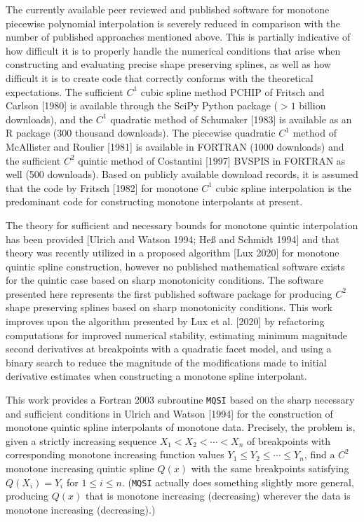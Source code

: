 The currently available peer reviewed and published software for
monotone piecewise polynomial interpolation is severely reduced in
comparison with the number of published approaches mentioned
above. This is partially indicative of how difficult it is to properly
handle the numerical conditions that arise when constructing and
evaluating precise shape preserving splines, as well as how difficult
it is to create code that correctly conforms with the theoretical
expectations. The sufficient $C^1$ cubic spline method PCHIP of
Fritsch and Carlson [1980] is available through the SciPy Python
package ($>1$ billion downloads), and the $C^1$ quadratic method of
Schumaker [1983] is available as an R package (300 thousand
downloads). The piecewise quadratic $C^1$ method of McAllister and
Roulier [1981] is available in FORTRAN (1000 downloads) and the
sufficient $C^2$ quintic method of Costantini [1997] BVSPIS in FORTRAN
as well (500 downloads). Based on publicly available download records,
it is assumed that the code by Fritsch [1982] for monotone $C^1$ cubic
spline interpolation is the predominant code for constructing monotone
interpolants at present.

\endred

The theory for sufficient and  necessary bounds for
monotone quintic interpolation has been provided [Ulrich and Watson
  1994; He{\ss} and Schmidt 1994] and that theory was recently
utilized in a proposed algorithm [Lux 2020] for monotone quintic
spline construction, however no published mathematical software exists
for the quintic case based on sharp monotonicity conditions. The
software presented here represents the first published software
package for producing $C^2$ shape preserving splines based on sharp
monotonicity conditions. This work improves upon the algorithm
presented by Lux et al. [2020] by refactoring computations for
improved numerical stability, estimating minimum magnitude second
derivatives at breakpoints with a quadratic facet model, and using a
binary search to reduce the magnitude of the modifications made to
initial derivative estimates when constructing a monotone spline
interpolant.

\beginred


\endred

This work provides a Fortran 2003 subroutine {\tt MQSI} based on the
sharp necessary and sufficient conditions in Ulrich and Watson [1994]
for the construction of monotone quintic spline interpolants of
monotone data. Precisely, the problem is, given a strictly increasing
sequence $X_1<X_2< \cdots <X_n$ of breakpoints with corresponding
monotone increasing function values $Y_1\le Y_2\le \cdots \le Y_n$,
find a $C^2$ monotone increasing quintic spline $Q(x)$ with the same
breakpoints satisfying $Q(X_i)=Y_i$ for $1\le i\le n$. ({\tt MQSI}
actually does something slightly more general, producing $Q(x)$ that
is monotone increasing (decreasing) wherever the data is monotone
increasing (decreasing).)

